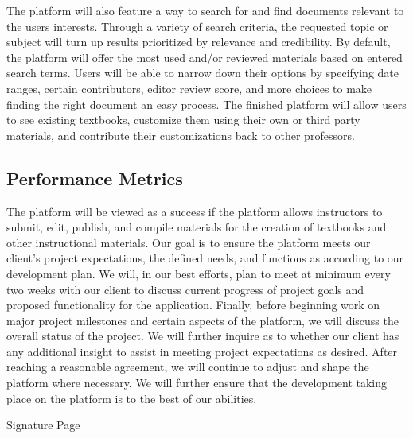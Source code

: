 \documentclass[letterpaper, 10pt, draftclsnofoot, onecolumn]{IEEEtran}
\begin{document}
\medskip

{\noindent The platform will also feature a way to search for and find 
documents relevant to the users interests. 
Through a variety of search criteria, the requested topic or subject will
turn up results prioritized by relevance and credibility. By default, the 
platform will offer the most used and/or reviewed materials
based on entered search terms. Users will be able to narrow down their 
options by specifying date ranges, certain contributors, editor review 
score, and more choices to make finding the right document an easy 
process. 
The finished platform will allow users to see existing 
textbooks, customize them using their own or third party materials, and 
contribute their customizations back to other professors. \par}

\subsection{Performance Metrics}
\vspace{1pc}

{\noindent The platform will be viewed as a success if the platform 
allows instructors to submit, edit, publish, and compile materials for 
the creation of textbooks and other instructional materials. 
Our goal is to ensure the platform meets our client's project 
expectations, the defined needs, and functions as according to our 
development plan. 
We will, in our best efforts, plan to meet at minimum every two weeks 
with our client to discuss current progress of project goals and 
proposed functionality for the application. 
Finally, before beginning work on major project milestones and certain 
aspects of the platform, we will discuss the overall status of the 
project. 
We will further inquire as to whether our client has any additional 
insight to assist in meeting project expectations as desired. 
After reaching a reasonable agreement, we will continue to adjust and 
shape the platform where necessary. 
We will further ensure that the development taking place on the platform 
is to the best of our abilities. \par}

\medskip

\newpage
\centerline{\sc \large Signature Page}
\vspace{5pc}


\centering
\end{document}
